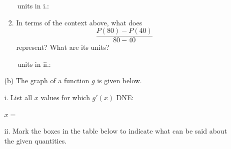 \documentclass[11pt]{article}
\begin{document}
\begin{enumerate}
\begin{enumerate}
\begin{enumerate}
    \vspace{1cm}


        \,\hfill units in i.: 
    

        \item In terms of the context above, what does 
        \[
        \frac{P(80)-P(40)}{80-40}
        \]
        represent? What are its units?
        
    \vspace{1cm}
     
    
        \,\hfill units in ii.: 
        
    \end{enumerate}

    \item[(b)] The graph of a function $g$ is given below.
\end{enumerate}

\begin{minipage}[t][2.75in][t]{0.35\textwidth}
\end{minipage}
\begin{minipage}[t][2.75in][t]{0.6\textwidth}
\begin{enumerate}
    \item[i.] List all $x$ values for which $g'(x)$ DNE: 

    \hfill $x=$ 


    \item[ii.] Mark the boxes in the table below to indicate what can be said about the given quantities.
\end{enumerate}


\end{minipage}
\end{enumerate}
\end{document}
